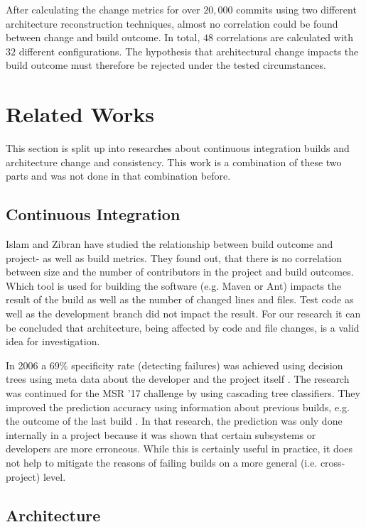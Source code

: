 \documentclass[conference]{IEEEtran}
\begin{document}
After calculating the change metrics for over $20,000$ commits using two different architecture reconstruction techniques, almost no correlation could be found between change and build outcome. In total, $48$ correlations are calculated with $32$ different configurations. The hypothesis that architectural change impacts the build outcome must therefore be rejected under the tested circumstances. 

\section{Related Works}

This section is split up into researches about continuous integration builds and architecture change and consistency. This work is a combination of these two parts and was not done in that combination before. 

\subsection{Continuous Integration}

Islam and Zibran \cite{FailsCorr} have studied the relationship between build outcome and project- as well as build metrics. They found out, that there is no correlation between size and the number of contributors in the project and build outcomes. Which tool is used for building the software (e.g. Maven or Ant) impacts the result of the build as well as the number of changed lines and files. Test code as well as the development branch did not impact the result. For our research it can be concluded that architecture, being affected by code and file changes, is a valid idea for investigation. 

In 2006 a 69\% specificity rate (detecting failures) was achieved using decision trees using meta data about the developer and the project itself \cite{Pred-Tree}.
The research was continued for the MSR '17 challenge by using cascading tree classifiers. They improved the prediction accuracy using information about previous builds, e.g. the outcome of the last build \cite{Pred-Cascade}. 
In that research, the prediction was only done internally in a project because it was shown that certain subsystems or developers are more erroneous. While this is certainly useful in practice, it does not help to mitigate the reasons of failing builds on a more general (i.e. cross-project) level.

\subsection{Architecture}
\end{document}
